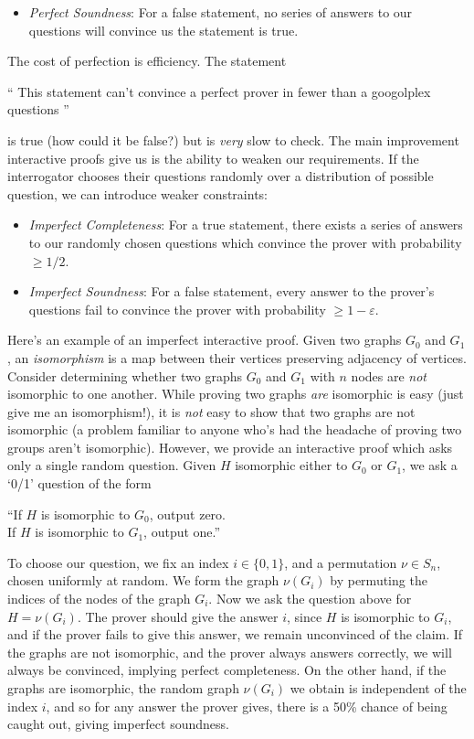 \documentclass{article}
\theoremstyle{plain}
\theoremstyle{remark}
\theoremstyle{definition}
\begin{document}
\begin{multicols}{2}
\begin{itemize}
    \item {\it Perfect Soundness}: For a false statement, no series of answers to our questions will convince us the statement is true.
\end{itemize}
%
The cost of perfection is efficiency. The statement
%
\begin{center} `` This statement can't convince a perfect prover in fewer than a googolplex questions '' \end{center}
%
is true (how could it be false?) but is {\it very} slow to check.
The main improvement interactive proofs give us is the ability to weaken our requirements. If the interrogator chooses their questions randomly over a distribution of possible question, we can introduce weaker constraints:
%
\begin{itemize}
    \item {\it Imperfect Completeness}: For a true statement, there exists a series of answers to our randomly chosen questions which convince the prover with probability $\geq 1/2$.

    \item {\it Imperfect Soundness}: For a false statement, every answer to the prover's questions fail to convince the prover with probability $\geq 1 - \varepsilon$.
\end{itemize}
%
Here's an example of an imperfect interactive proof. Given two graphs $G_0$ and $G_1$, an {\it isomorphism} is a map between their vertices preserving adjacency of vertices. Consider determining whether two graphs $G_0$ and $G_1$ with $n$ nodes are {\it not} isomorphic to one another. While proving two graphs {\it are} isomorphic is easy (just give me an isomorphism!), it is {\it not} easy to show that two graphs are not isomorphic (a problem familiar to anyone who's had the headache of proving two groups aren't isomorphic). However, we provide an interactive proof which asks only a single random question. Given $H$ isomorphic either to $G_0$ or $G_1$, we ask a `0/1' question of the form
%
\begin{center} ``If $H$ is isomorphic to $G_0$, output zero.\\
If $H$ is isomorphic to $G_1$, output  one.'' \end{center}
%
To choose our question, we fix an index $i \in \{ 0, 1 \}$, and a permutation $\nu \in S_n$, chosen uniformly at random. We form the graph $\nu(G_i)$ by permuting the indices of the nodes of the graph $G_i$. Now we ask the question above for $H = \nu(G_i)$. The prover should give the answer $i$, since $H$ is isomorphic to $G_i$, and if the prover fails to give this answer, we remain unconvinced of the claim. If the graphs are not isomorphic, and the prover always answers correctly, we will always be convinced, implying perfect completeness. On the other hand, if the graphs are isomorphic, the random graph $\nu(G_i)$ we obtain is independent of the index $i$, and so for any answer the prover gives, there is a 50\% chance of being caught out, giving imperfect soundness.


\end{multicols}
\end{document}
